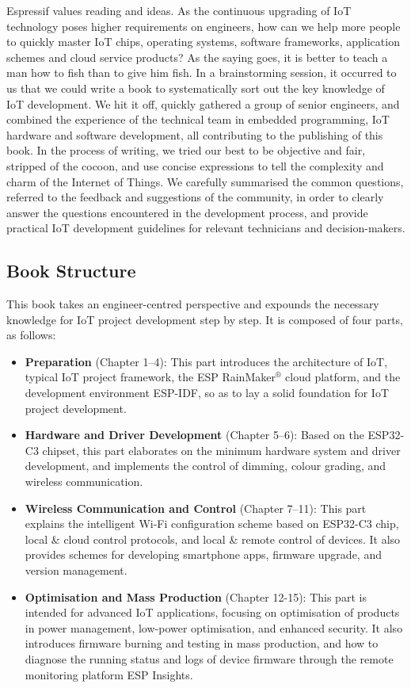 \documentclass[a4paper,12pt]{book}
\begin{document}
Espressif values reading and ideas. As the continuous upgrading of IoT technology poses higher requirements on engineers, how can we help more people to quickly master IoT chips, operating systems, software frameworks, application schemes and cloud service products? As the saying goes, it is better to teach a man how to fish than to give him fish. In a brainstorming session, it occurred to us that we could write a book to systematically sort out the key knowledge of IoT development. We hit it off, quickly gathered a group of senior engineers, and combined the experience of the technical team in embedded programming, IoT hardware and software development, all contributing to the publishing of this book. In the process of writing, we tried our best to be objective and fair, stripped of the cocoon, and use concise expressions to tell the complexity and charm of the Internet of Things. We carefully summarised the common questions, referred to the feedback and suggestions of the community, in order to clearly answer the questions encountered in the development process, and provide practical IoT development guidelines for relevant technicians and decision-makers.

\subsection*{Book Structure}
This book takes an engineer-centred perspective and expounds the necessary knowledge for IoT project development step by step. It is composed of four parts, as follows:
\begin{itemize}
    \item \textbf{Preparation} (Chapter 1–4): This part introduces the architecture of IoT, typical IoT project framework, the ESP RainMaker$^\circledR$ cloud platform, and the development environment ESP-IDF, so as to lay a solid foundation for IoT project development.
    \item \textbf{Hardware and Driver Development} (Chapter 5–6): Based on the ESP32-C3 chipset, this part elaborates on the minimum hardware system and driver development, and implements the control of dimming, colour grading, and wireless communication.
    \item \textbf{Wireless Communication and Control} (Chapter 7–11): This part explains the intelligent Wi-Fi configuration scheme based on ESP32-C3 chip, local \& cloud control protocols, and local \& remote control of devices. It also provides schemes for developing smartphone apps, firmware upgrade, and version management.
    \item \textbf{Optimisation and Mass Production} (Chapter 12-15): This part is intended for advanced IoT applications, focusing on optimisation of products in power management, low-power optimisation, and enhanced security. It also introduces firmware burning and testing in mass production, and how to diagnose the running status and logs of device firmware through the remote monitoring platform ESP Insights.
\end{itemize}
\end{document}
